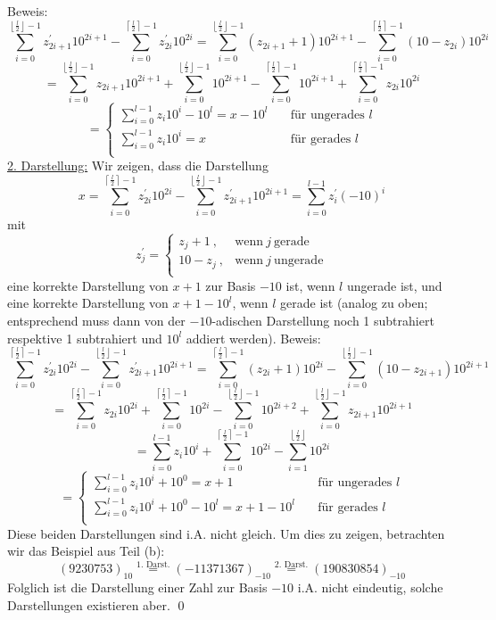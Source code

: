 \documentclass[11pt]{scrartcl}
\theoremstyle{dotless}
\newcommand{\floor}[1]{\left\lfloor #1\right\rfloor}
\newcommand{\ceil}[1]{\left\lceil #1\right\rceil}
\begin{document}
		Beweis:\newline
		$$\sum_{i=0}^{\floor{\frac{l}{2}}-1}z_{2i+1}^{\prime} 10^{2i+1}-\sum_{i=0}^{\ceil{\frac{l}{2}}-1}z_{2i}^{\prime} 10^{2i}=\sum_{i=0}^{\floor{\frac{l}{2}}-1}(z_{2i+1}+1) 10^{2i+1}-\sum_{i=0}^{\ceil{\frac{l}{2}}-1}(10-z_{2i})10^{2i}$$
		$$=\sum_{i=0}^{\floor{\frac{l}{2}}-1}z_{2i+1} 10^{2i+1}+\sum_{i=0}^{\floor{\frac{l}{2}}-1} 10^{2i+1}-\sum_{i=0}^{\ceil{\frac{l}{2}}-1} 10^{2i+1}+\sum_{i=0}^{\ceil{\frac{l}{2}}-1}z_{2i} 10^{2i}$$
		$$=\left\{\begin{array}{ll}
		\sum_{i=0}^{l-1}z_i10^i-10^{l}=x-10^{l}\quad&\text{für ungerades }l\\
		\sum_{i=0}^{l-1}z_i10^i=x\quad&\text{für gerades }l\\
		\end{array}\right.
		$$
		\underline{2. Darstellung:}\newline
		Wir zeigen, dass die Darstellung
		$$x=\sum_{i=0}^{\ceil{\frac{l}{2}}-1}z_{2i}^{\prime} 10^{2i}-\sum_{i=0}^{\floor{\frac{l}{2}}-1}z_{2i+1}^{\prime} 10^{2i+1}=\sum_{i=0}^{l-1}z_{i}^{\prime} (-10)^{i}$$
		mit
		$$z_j^{\prime}=\left\{\begin{array}{ll}
		z_j+1~,& \text{wenn}~j~ \text{gerade}\\
		10-z_j~,&\text{wenn}~j~ \text{ungerade}\\
		\end{array}\right.$$
		eine korrekte Darstellung von $x+1$ zur Basis $-10$ ist, wenn $l$ ungerade ist, und eine korrekte Darstellung von $x+1-10^l$, wenn $l$ gerade ist (analog zu oben; entsprechend muss dann von der $-10$-adischen Darstellung noch 1 subtrahiert respektive 1 subtrahiert und $10^l$ addiert werden).\newline
		Beweis:
		$$\sum_{i=0}^{\ceil{\frac{l}{2}}-1}z_{2i}^{\prime} 10^{2i}-\sum_{i=0}^{\floor{\frac{l}{2}}-1}z_{2i+1}^{\prime} 10^{2i+1}=\sum_{i=0}^{\ceil{\frac{l}{2}}-1}(z_{2i}+1) 10^{2i}-\sum_{i=0}^{\floor{\frac{l}{2}}-1}(10-z_{2i+1}) 10^{2i+1}$$
		$$=\sum_{i=0}^{\ceil{\frac{l}{2}}-1}z_{2i} 10^{2i} + \sum_{i=0}^{\ceil{\frac{l}{2}}-1} 10^{2i} - \sum_{i=0}^{\floor{\frac{l}{2}}-1} 10^{2i+2} + \sum_{i=0}^{\floor{\frac{l}{2}}-1}z_{2i+1} 10^{2i+1}$$
		$$=\sum_{i=0}^{l-1}z_i10^i + \sum_{i=0}^{\ceil{\frac{l}{2}}-1} 10^{2i} - 
		\sum_{i=1}^{\floor{\frac{l}{2}}} 10^{2i}$$
		$$=\left\{\begin{array}{ll}
		\sum_{i=0}^{l-1}z_i10^i+10^0=x+1\quad&\text{für ungerades }l\\
		\sum_{i=0}^{l-1}z_i10^i +10^0 - 10^l=x+1-10^l\quad&\text{für gerades }l\\
		\end{array}\right.
		$$
		Diese beiden Darstellungen sind i.A. nicht gleich. Um dies zu zeigen, betrachten wir das Beispiel aus Teil (b):
		$$(9230753)_{10}\overset{\text{1. Darst.}}{=}(-11371367)_{-10}\overset{\text{2. Darst.}}{=}(190830854)_{-10}$$
		Folglich ist die Darstellung einer Zahl zur Basis $-10$ i.A. nicht eindeutig, solche Darstellungen existieren aber. \qed
\end{document}
